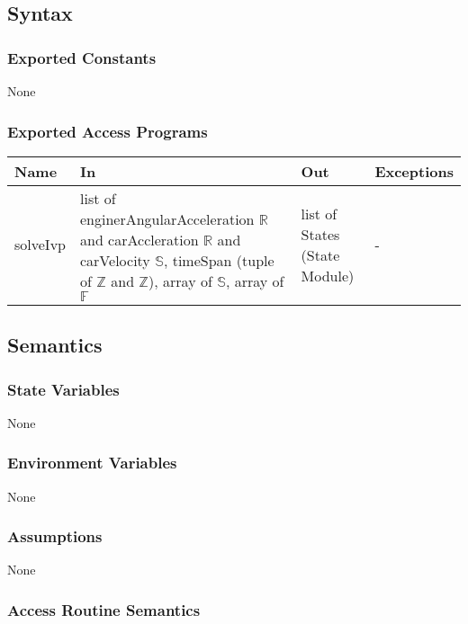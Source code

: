 \documentclass[12pt, titlepage]{article}
\begin{document}
\subsection{Syntax}

\subsubsection{Exported Constants}
None

\subsubsection{Exported Access Programs}

\begin{center}
\begin{tabular}{p{2cm} p{4cm} p{4cm} p{2cm}}
\hline
\textbf{Name} & \textbf{In} & \textbf{Out} & \textbf{Exceptions} \\
\hline
solveIvp & list of enginerAngularAcceleration $\mathbb{R}$ and carAccleration $\mathbb{R}$ and carVelocity $\mathbb{S}$, timeSpan (tuple of $\mathbb{Z}$ and $\mathbb{Z}$), array of $\mathbb{S}$, array of $\mathbb{F}$  & list of States (State Module) & - \\
\hline
\end{tabular}
\end{center}

\subsection{Semantics}

\subsubsection{State Variables}

None

\subsubsection{Environment Variables}

None

\subsubsection{Assumptions}

None

\subsubsection{Access Routine Semantics}
\end{document}
